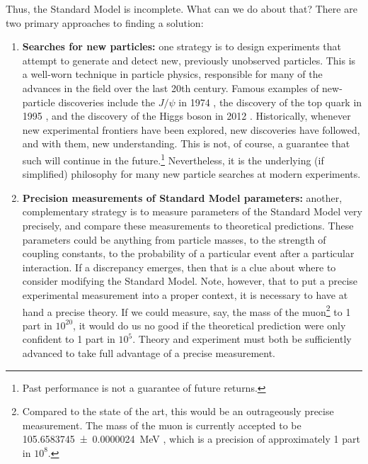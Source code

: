 \documentclass[12pt,twoside,class=../reedthesis, crop=false]{standalone}
\begin{document}
	Thus, the Standard Model is incomplete. What can we do about that? There are two primary approaches to finding a solution:
	\begin{enumerate}
		\item \textbf{Searches for new particles:} one strategy is to design experiments that attempt to generate and detect new, previously unobserved particles. This is a well-worn technique in particle physics, responsible for many of the advances in the field over the last 20th century. Famous examples of new-particle discoveries include the $J/\psi$ in 1974 \cite{aubert_experimental_1974,augustin_discovery_1974}, the discovery of the top quark in 1995 \cite{d0_collaboration_observation_1995,cdf_collaboration_observation_1995}, and the discovery of the Higgs boson in 2012 \cite{atlas_collaboration_observation_2012,cms_collaboration_observation_2012}. Historically, whenever new experimental frontiers have been explored, new discoveries have followed, and with them, new understanding. This is not, of course, a guarantee that such will continue in the future.\footnote{Past performance is not a guarantee of future returns.} Nevertheless, it is the underlying (if simplified) philosophy for many new particle searches at modern experiments.

		\item \textbf{Precision measurements of Standard Model parameters:} another, complementary strategy is to measure parameters of the Standard Model very precisely, and compare these measurements to theoretical predictions. These parameters could be anything from particle masses, to the strength of coupling constants, to the probability of a particular event after a particular interaction. If a discrepancy emerges, then that is a clue about where to consider modifying the Standard Model. Note, however, that to put a precise experimental measurement into a proper context, it is necessary to have at hand a precise theory. If we could measure, say, the mass of the muon\footnote{Compared to the state of the art, this would be an outrageously precise measurement. The mass of the muon is currently accepted to be \SI{105.6583745(24)}{\mega\electronvolt} \cite{particle_data_group_review_2020}, which is a precision of approximately 1 part in $10^{8}$.} to 1 part in $10^{20}$, it would do us no good if the theoretical prediction were only confident to 1 part in $10^5$. Theory and experiment must both be sufficiently advanced to take full advantage of a precise measurement.
	\end{enumerate}
\end{document}
